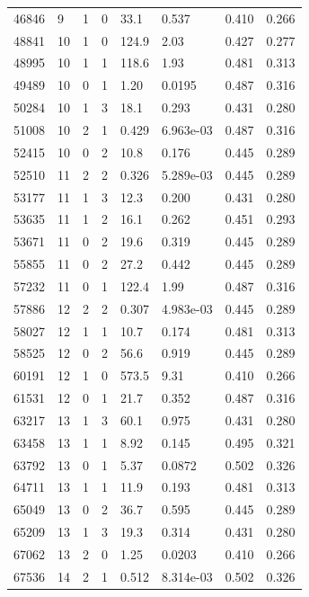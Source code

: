\documentclass[preview]{standalone}
\begin{document}
{{{\begin{tabular}{L{1.2cm}C{1.2cm} C{0.3cm}C{0.5cm} C{1.4cm}C{1.4cm} C{1.4cm}C{1.4cm}}
  46846  &     9  & 1     &  0 &  33.1  & 0.537  & 0.410 &  0.266   \\ 
  48841  &    10  & 1     &  0 &  124.9  & 2.03  & 0.427 &  0.277   \\ 
  48995  &    10  & 1     &  1 &  118.6  & 1.93  & 0.481 &  0.313   \\ 
  49489  &    10  & 0     &  1 &  1.20  & 0.0195  & 0.487 &  0.316   \\ 
  50284  &    10  & 1     &  3 &  18.1  & 0.293  & 0.431 &  0.280   \\ 
  51008  &    10  & 2     &  1 &  0.429  & 6.963e-03  & 0.487 &  0.316   \\ 
  52415  &    10  & 0     &  2 &  10.8  & 0.176  & 0.445 &  0.289   \\ 
  52510  &    11  & 2     &  2 &  0.326  & 5.289e-03  & 0.445 &  0.289   \\ 
  53177  &    11  & 1     &  3 &  12.3  & 0.200  & 0.431 &  0.280   \\ 
  53635  &    11  & 1     &  2 &  16.1  & 0.262  & 0.451 &  0.293   \\ 
  53671  &    11  & 0     &  2 &  19.6  & 0.319  & 0.445 &  0.289   \\ 
  55855  &    11  & 0     &  2 &  27.2  & 0.442  & 0.445 &  0.289   \\ 
  57232  &    11  & 0     &  1 &  122.4  & 1.99  & 0.487 &  0.316   \\ 
  57886  &    12  & 2     &  2 &  0.307  & 4.983e-03  & 0.445 &  0.289   \\ 
  58027  &    12  & 1     &  1 &  10.7  & 0.174  & 0.481 &  0.313   \\ 
  58525  &    12  & 0     &  2 &  56.6  & 0.919  & 0.445 &  0.289   \\ 
  60191  &    12  & 1     &  0 &  573.5  & 9.31  & 0.410 &  0.266   \\ 
  61531  &    12  & 0     &  1 &  21.7  & 0.352  & 0.487 &  0.316   \\ 
  63217  &    13  & 1     &  3 &  60.1  & 0.975  & 0.431 &  0.280   \\ 
  63458  &    13  & 1     &  1 &  8.92  & 0.145  & 0.495 &  0.321   \\ 
  63792  &    13  & 0     &  1 &  5.37  & 0.0872  & 0.502 &  0.326   \\ 
  64711  &    13  & 1     &  1 &  11.9  & 0.193  & 0.481 &  0.313   \\ 
  65049  &    13  & 0     &  2 &  36.7  & 0.595  & 0.445 &  0.289   \\ 
  65209  &    13  & 1     &  3 &  19.3  & 0.314  & 0.431 &  0.280   \\ 
  67062  &    13  & 2     &  0 &  1.25  & 0.0203  & 0.410 &  0.266   \\ 
  67536  &    14  & 2     &  1 &  0.512  & 8.314e-03  & 0.502 &  0.326   \\ 
\hline 
\end{tabular} 

}}}
\end{document}
